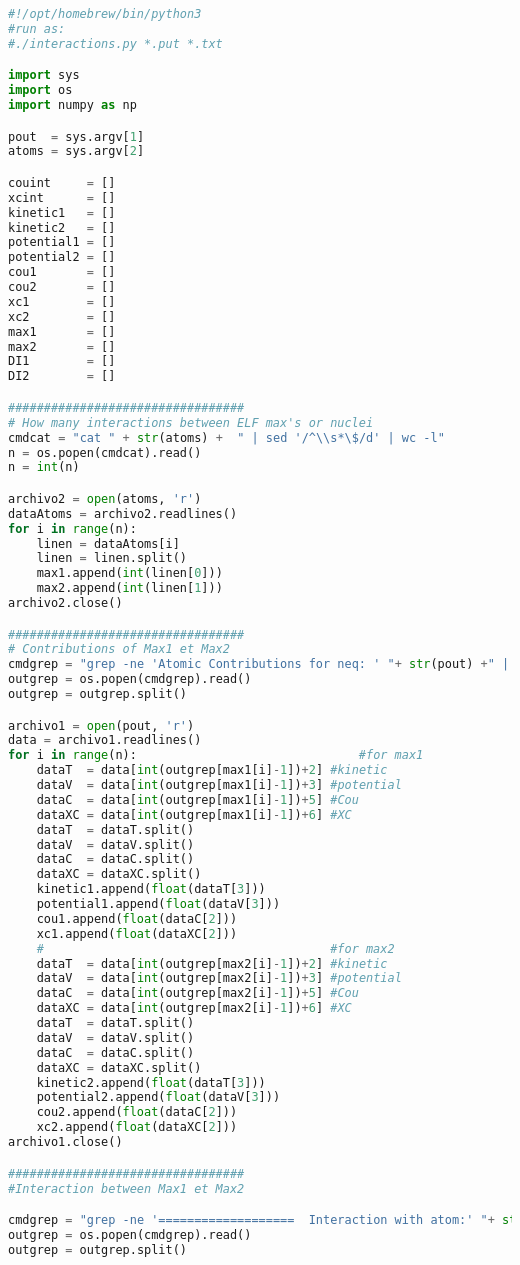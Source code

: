 \begin{lstlisting}[language=Python]
#!/opt/homebrew/bin/python3
#run as:
#./interactions.py *.put *.txt

import sys
import os
import numpy as np

pout  = sys.argv[1]
atoms = sys.argv[2]

couint     = []
xcint      = []
kinetic1   = []
kinetic2   = []
potential1 = []
potential2 = []
cou1       = []
cou2       = []
xc1        = []
xc2        = []
max1       = []
max2       = []
DI1        = []
DI2        = []

#################################
# How many interactions between ELF max's or nuclei
cmdcat = "cat " + str(atoms) +  " | sed '/^\\s*\$/d' | wc -l"
n = os.popen(cmdcat).read() 
n = int(n)

archivo2 = open(atoms, 'r')
dataAtoms = archivo2.readlines()
for i in range(n):
	linen = dataAtoms[i]
	linen = linen.split()
	max1.append(int(linen[0]))
	max2.append(int(linen[1]))
archivo2.close()

#################################
# Contributions of Max1 et Max2
cmdgrep = "grep -ne 'Atomic Contributions for neq: ' "+ str(pout) +" | cut -f1 -d:"
outgrep = os.popen(cmdgrep).read()
outgrep = outgrep.split()

archivo1 = open(pout, 'r')
data = archivo1.readlines()
for i in range(n):                               #for max1
	dataT  = data[int(outgrep[max1[i]-1])+2] #kinetic
	dataV  = data[int(outgrep[max1[i]-1])+3] #potential
	dataC  = data[int(outgrep[max1[i]-1])+5] #Cou
	dataXC = data[int(outgrep[max1[i]-1])+6] #XC
	dataT  = dataT.split()
	dataV  = dataV.split()
	dataC  = dataC.split()
	dataXC = dataXC.split()
	kinetic1.append(float(dataT[3]))
	potential1.append(float(dataV[3]))
	cou1.append(float(dataC[2]))
	xc1.append(float(dataXC[2]))
	#                                        #for max2
	dataT  = data[int(outgrep[max2[i]-1])+2] #kinetic
	dataV  = data[int(outgrep[max2[i]-1])+3] #potential
	dataC  = data[int(outgrep[max2[i]-1])+5] #Cou
	dataXC = data[int(outgrep[max2[i]-1])+6] #XC
	dataT  = dataT.split()
	dataV  = dataV.split()
	dataC  = dataC.split()
	dataXC = dataXC.split()
	kinetic2.append(float(dataT[3]))
	potential2.append(float(dataV[3]))
	cou2.append(float(dataC[2]))
	xc2.append(float(dataXC[2]))
archivo1.close()

#################################
#Interaction between Max1 et Max2

cmdgrep = "grep -ne '===================  Interaction with atom:' "+ str(pout) +" | cut -f1 -d:"
outgrep = os.popen(cmdgrep).read()
outgrep = outgrep.split()


\end{lstlisting}
